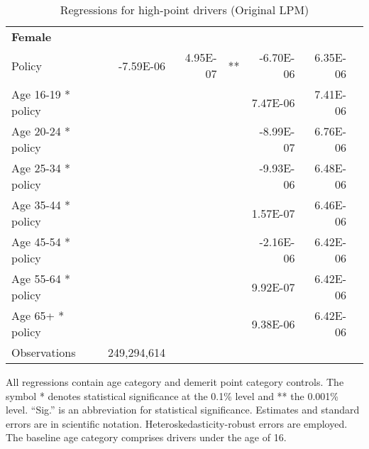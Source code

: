 \begin{table}
\begin{tabular}{l r r l r r l}
\hline 

\textbf{Female} \\ 

Policy             &  -7.59E-06        &  4.95E-07       &   **       &  -6.70E-06        &  6.35E-06       &            \\ 
Age 16-19 * policy           & & &  &  7.47E-06        &  7.41E-06       &            \\ 
Age 20-24 * policy           & & &  &  -8.99E-07        &  6.76E-06       &            \\ 
Age 25-34 * policy           & & &  &  -9.93E-06        &  6.48E-06       &            \\ 
Age 35-44 * policy           & & &  &  1.57E-07        &  6.46E-06       &            \\ 
Age 45-54 * policy           & & &  &  -2.16E-06        &  6.42E-06       &            \\ 
Age 55-64 * policy           & & &  &  9.92E-07        &  6.42E-06       &            \\ 
Age 65+ * policy           & & &  &  9.38E-06        &  6.42E-06       &            \\ 
Observations & 249,294,614 \\ 


\hline 

\end{tabular} 
\caption{Regressions for high-point drivers (Original LPM)} 
All regressions contain age category and demerit point category controls. 
The symbol * denotes statistical significance at the 0.1\% level 
and ** the 0.001\% level. 
``Sig.'' is an abbreviation for statistical significance. 
Estimates and standard errors are in scientific notation. 
Heteroskedasticity-robust errors are employed. 
The baseline age category comprises drivers under the age of 16. 
\label{tab:orig_high_pt_regs} 
\end{table} 
 

